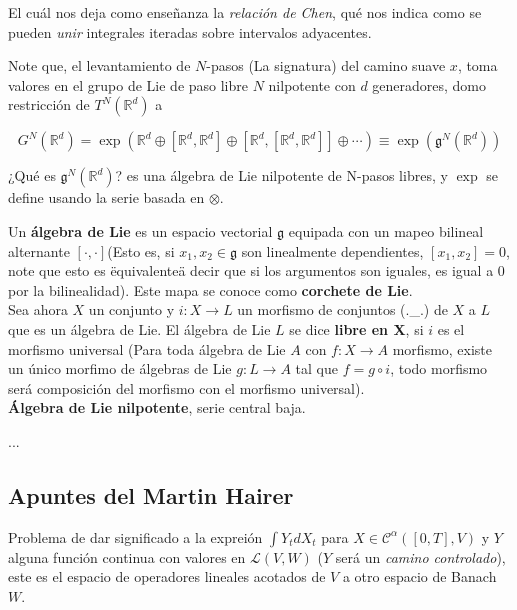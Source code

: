El cuál nos deja como enseñanza la \textit{relación de Chen}, qué nos indica como se pueden \textit{unir} integrales iteradas sobre intervalos adyacentes. 

Note que, el levantamiento de $N$-pasos (La signatura) del camino suave $x$, toma valores en el grupo de Lie de paso libre $N$ nilpotente con $d$ generadores, domo restricción de $T^N (\mathbb{R}^d)$ a 

\[
	G^N (\mathbb{R}^d) = \exp \left( \mathbb{R}^d \oplus \left[ \mathbb{R}^d, \mathbb{R}^d \right] \oplus \left[ \mathbb{R}^d, \left[ \mathbb{R}^d, \mathbb{R}^d \right] \right] \oplus \cdots \right) \equiv \exp( \mathfrak{g}^N (\mathbb{R}^d) )
\]

¿Qué es $\mathfrak{g}^N (\mathbb{R}^d)$? es una álgebra de Lie nilpotente de N-pasos libres, y $\exp$ se define usando la serie basada en $\otimes$.

\begin{boxDef}
	Un \textbf{álgebra de Lie} es un espacio vectorial $\mathfrak{g}$ equipada con un mapeo bilineal alternante $[\cdot, \cdot] $(Esto es, si $x_1, x_2 \in \mathfrak{g}$ son linealmente dependientes, $[x_1, x_2] = 0$, note que esto es \"equivalente\" a decir que si los argumentos son iguales, es igual a 0 por la bilinealidad). Este mapa se conoce como \textbf{corchete de Lie}. \\

	Sea ahora $X$ un conjunto y $i: X \rightarrow L$ un morfismo de conjuntos (.\_.) de $X$ a $L$ que es un álgebra de Lie. El álgebra de Lie $L$ se dice \textbf{libre en X}, si $i$ es el morfismo universal (Para toda álgebra de Lie $A$ con $f: X \rightarrow A$ morfismo, existe un único morfimo de álgebras de Lie $g: L \rightarrow A$ tal que $f = g \circ i$, todo morfismo será composición del morfismo con el morfismo universal). \\

	\textbf{Álgebra de Lie nilpotente}, serie central baja.
\end{boxDef}


...



\subsection{Apuntes del Martin Hairer}

Problema de dar significado a la expreión $\int Y_t dX_t$ para $X \in \mathscr{C}^{\alpha} ([0,T], V)$ y $Y$ alguna función continua con valores en $\mathcal{L}(V,W)$ ($Y$ será un \textit{camino controlado}), este es el espacio de operadores lineales acotados de $V$ a otro espacio de Banach $W$. 

